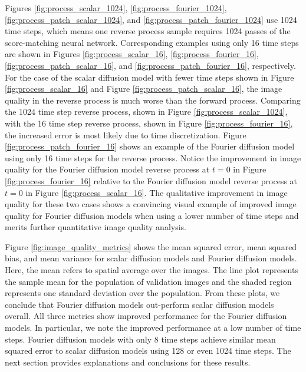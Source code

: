\documentclass[12pt,]{article}
\begin{document}
Figures \ref{fig:process_scalar_1024}, \ref{fig:process_fourier_1024}, \ref{fig:process_patch_scalar_1024}, and \ref{fig:process_patch_fourier_1024} use 1024 time steps, which means one reverse process sample requires 1024 passes of the score-matching neural network. Corresponding examples using only 16 time steps are shown in Figures \ref{fig:process_scalar_16}, \ref{fig:process_fourier_16}, \ref{fig:process_patch_scalar_16},  and  \ref{fig:process_patch_fourier_16}, respectively. For the case of the scalar diffusion model with fewer time steps shown in Figure \ref{fig:process_scalar_16} and Figure \ref{fig:process_patch_scalar_16}, the image quality in the reverse process is much worse than the forward process. Comparing the 1024 time step reverse process, shown in Figure \ref{fig:process_scalar_1024}, with the 16 time step reverse process, shown in Figure \ref{fig:process_fourier_16}, the increased error is most likely due to time discretization. Figure \ref{fig:process_patch_fourier_16} shows an example of the Fourier diffusion model using only 16 time steps for the reverse process. Notice the improvement in image quality for the Fourier diffusion model reverse process at $t=0$ in Figure \ref{fig:process_fourier_16} relative to the Fourier diffusion model reverse process  at $t=0$ in Figure \ref{fig:process_scalar_16}. The qualitative improvement in image quality for these two cases shows a convincing visual example of improved image quality for Fourier diffusion models when using a lower number of time steps and merits further quantitative image quality analysis. 

Figure \ref{fig:image_quality_metrics} shows the mean squared error, mean squared bias, and mean variance for scalar diffusion models and Fourier diffusion models. Here, the mean refers to spatial average over the images. The line plot represents the sample mean for the population of validation images and the shaded region represents one standard deviation over the population. From these plots, we conclude that Fourier diffusion models out-perform scalar diffusion models overall. All three metrics show improved performance for the Fourier diffusion models. In particular, we note the improved performance at a low number of time steps. Fourier diffusion models with only 8 time steps achieve similar mean squared error to scalar diffusion models using 128 or even 1024 time steps. The next section provides explanations and conclusions for these results.


\vspace{-6mm}
\end{document}

